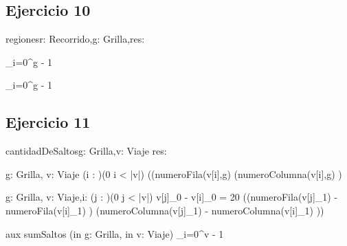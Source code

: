 \documentclass[a4paper]{article}
\begin{document}
\subsection*{Ejercicio 10}
\begin{proc}{regiones}{\In r: Recorrido,\In g: Grilla,\Out res: }{}
	
	{\sum_{i=0}^{\longitud g - 1}}	

	{\sum_{i=0}^{\longitud g - 1}}

\end{proc}


\subsection*{Ejercicio 11}
\begin{proc}{cantidadDeSaltos}{\In g: Grilla,\In v: Viaje \Out res: \ent}{}
	 
	 
	  {\In g: Grilla, \In v: Viaje} {
	(\forall i : \ent)(0 \leq i < |v|) ((numeroFila(v[i],g)  \y  (numeroColumna(v[i],g) )
	}
	
	
	 {\In g: Grilla, \In v: Viaje,\In i: \ent}{ 
		(\exists j : \ent)(0 \leq j < |v|)  v[j]_{0} -  v[i]_{0} = 20 \yLuego ((numeroFila(v[j]_{1}) - numeroFila(v[i]_{1}) ) \vee (numeroColumna(v[j]_{1}) - numeroColumna(v[i]_{1}) )) }	
		
	aux sumSaltos (in g: Grilla, in v: Viaje) {
	  \sum_{i=0}^{\longitud v - 1} 
	}	
\end{proc}	
\end{document}
